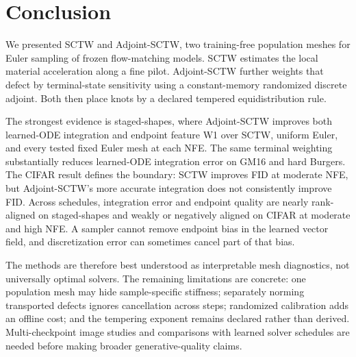 \section{Conclusion}
\label{sec:conclusion}

We presented SCTW and Adjoint-SCTW, two training-free population meshes for Euler sampling of
frozen flow-matching models. SCTW estimates the local material acceleration along a fine pilot.
Adjoint-SCTW further weights that defect by terminal-state sensitivity using a constant-memory
randomized discrete adjoint. Both then place knots by a declared tempered equidistribution rule.

The strongest evidence is staged-shapes, where Adjoint-SCTW improves both learned-ODE integration
and endpoint feature W1 over SCTW, uniform Euler, and every tested fixed Euler mesh at each NFE.
The same terminal weighting substantially reduces learned-ODE integration error on GM16 and hard
Burgers. The CIFAR result defines the boundary: SCTW improves FID at moderate NFE, but
Adjoint-SCTW's more accurate integration does not consistently improve FID. Across schedules,
integration error and endpoint quality are nearly rank-aligned on staged-shapes and weakly or
negatively aligned on CIFAR at moderate and high NFE. A sampler cannot remove endpoint bias in the
learned vector field, and discretization error can sometimes cancel part of that bias.

The methods are therefore best understood as interpretable mesh diagnostics, not universally
optimal solvers. The remaining limitations are concrete: one population mesh may hide
sample-specific stiffness; separately norming transported defects ignores cancellation across
steps; randomized calibration adds an offline cost; and the tempering exponent remains declared
rather than derived. Multi-checkpoint image studies and comparisons with learned solver schedules
are needed before making broader generative-quality claims.
